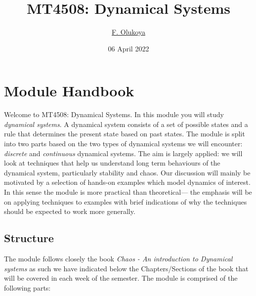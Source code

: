 \documentclass[
  a4paper,
  oneside,
  final]{krantz}
\title{MT4508: Dynamical Systems}
\author{\href{fo55@st-andrews.ac.uk}{F. Olukoya}}
\date{06 April 2022}
\theoremstyle{definition}
\theoremstyle{definition}
\theoremstyle{definition}
\theoremstyle{definition}
\theoremstyle{remark}
\begin{document}
\maketitle

{
\hypersetup{linkcolor=}
\setcounter{tocdepth}{2}
\tableofcontents
}
\hypertarget{Module-hand-book}{%
\chapter*{Module Handbook}\label{Module-hand-book}}


Welcome to MT4508: Dynamical Systems. In this module you will study \emph{dynamical systems}. A dynamical system consists of a set of possible states and a rule that determines the present state based on past states. The module is split into two parts based on the two types of dynamical systems we will encounter: \emph{discrete} and \emph{continuous} dynamical systems. The aim is largely applied: we will look at techniques that help us understand long term behaviours of the dynamical system, particularly stability and chaos. Our discussion will mainly be motivated by a selection of hands-on examples which model dynamics of interest. In this sense the module is more practical than theoretical--- the emphasis will be on applying techniques to examples with brief indications of why the techniques should be expected to work more generally.

\hypertarget{structure}{%
\section*{Structure}\label{structure}}


The module follows closely the book \emph{Chaos - An introduction to Dynamical systems} \citep{ASY} as such we have indicated below the Chapters/Sections of the book that will be covered in each week of the semester. The module is comprised of the following parts:
\end{document}
